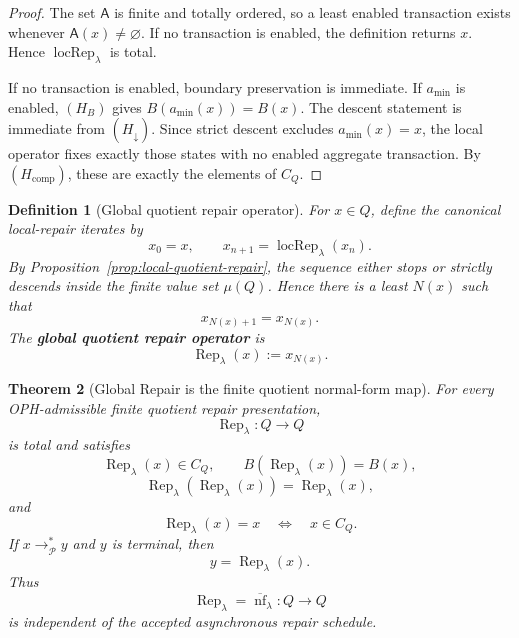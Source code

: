 \documentclass[11pt]{article}
\newtheorem{theorem}{Theorem}[section]
\newtheorem{definition}[theorem]{Definition}
\theoremstyle{remark}
\theoremstyle{plain}
\begin{document}
\begin{proof}
The set \(\mathsf A\) is finite and totally ordered, so a least enabled transaction exists whenever
\(\mathsf A(x)\ne\varnothing\).  If no transaction is enabled, the definition returns \(x\).  Hence
\(\operatorname{locRep}_\lambda\) is total.

If no transaction is enabled, boundary preservation is immediate.  If \(a_{\min}\) is enabled,
\((H_B)\) gives \(B(a_{\min}(x))=B(x)\).  The descent statement is immediate from
\((H_\downarrow)\).  Since strict descent excludes \(a_{\min}(x)=x\), the local operator fixes
exactly those states with no enabled aggregate transaction.  By \((H_{\mathrm{comp}})\), these are
exactly the elements of \(C_Q\).
\end{proof}

\begin{definition}[Global quotient repair operator]\label{def:global-quotient-repair-operator}
For \(x\in Q\), define the canonical local-repair iterates by
\[
x_0=x,\qquad x_{n+1}=\operatorname{locRep}_\lambda(x_n).
\]
By Proposition~\ref{prop:local-quotient-repair}, the sequence either stops or strictly descends
inside the finite value set \(\mu(Q)\).  Hence there is a least \(N(x)\) such that
\[
x_{N(x)+1}=x_{N(x)}.
\]
The \textbf{global quotient repair operator} is
\[
\operatorname{Rep}_\lambda(x):=x_{N(x)}.
\]
\end{definition}

\begin{theorem}[Global Repair is the finite quotient normal-form map]\label{thm:quotient-repair-normal-form}
For every OPH-admissible finite quotient repair presentation,
\[
\operatorname{Rep}_\lambda:Q\to Q
\]
is total and satisfies
\[
\operatorname{Rep}_\lambda(x)\in C_Q,\qquad
B(\operatorname{Rep}_\lambda(x))=B(x),
\]
\[
\operatorname{Rep}_\lambda(\operatorname{Rep}_\lambda(x))
=
\operatorname{Rep}_\lambda(x),
\]
and
\[
\operatorname{Rep}_\lambda(x)=x
\quad\Longleftrightarrow\quad
x\in C_Q.
\]
If \(x\to_{\mathcal P}^{\!*}y\) and \(y\) is terminal, then
\[
y=\operatorname{Rep}_\lambda(x).
\]
Thus
\[
\operatorname{Rep}_\lambda=\overline{\operatorname{nf}}_\lambda:Q\to Q
\]
is independent of the accepted asynchronous repair schedule.
\end{theorem}
\end{document}
